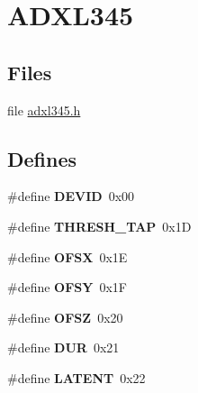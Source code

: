 \hypertarget{group___a_d_x_l345}{
\section{ADXL345}
\label{group___a_d_x_l345}
}
\subsection*{Files}
\begin{DoxyCompactItemize}
\item 
file \hyperlink{adxl345_8h}{adxl345.h}
\end{DoxyCompactItemize}
\subsection*{Defines}
\begin{DoxyCompactItemize}
\item 
\hypertarget{group___a_d_x_l345_gaa58e0287a2b6f1815a98c7e5e6724e20}{
\#define {\bfseries DEVID}~0x00}
\label{group___a_d_x_l345_gaa58e0287a2b6f1815a98c7e5e6724e20}

\item 
\hypertarget{group___a_d_x_l345_gad8cef9349ca846328f439fcb51993bb5}{
\#define {\bfseries THRESH\_\-TAP}~0x1D}
\label{group___a_d_x_l345_gad8cef9349ca846328f439fcb51993bb5}

\item 
\hypertarget{group___a_d_x_l345_gaed743ef8e7fd8d1bc4f3a456e730c432}{
\#define {\bfseries OFSX}~0x1E}
\label{group___a_d_x_l345_gaed743ef8e7fd8d1bc4f3a456e730c432}

\item 
\hypertarget{group___a_d_x_l345_ga8033e657e74ff6ca78685f261033a8c5}{
\#define {\bfseries OFSY}~0x1F}
\label{group___a_d_x_l345_ga8033e657e74ff6ca78685f261033a8c5}

\item 
\hypertarget{group___a_d_x_l345_ga0edf225116b246ec3316391691a2a634}{
\#define {\bfseries OFSZ}~0x20}
\label{group___a_d_x_l345_ga0edf225116b246ec3316391691a2a634}

\item 
\hypertarget{group___a_d_x_l345_gaf8ac375e38f541d5731744e12fec07ca}{
\#define {\bfseries DUR}~0x21}
\label{group___a_d_x_l345_gaf8ac375e38f541d5731744e12fec07ca}

\item 
\hypertarget{group___a_d_x_l345_gacad26272f1e050d1b2b2a41b84a471a2}{
\#define {\bfseries LATENT}~0x22}
\label{group___a_d_x_l345_gacad26272f1e050d1b2b2a41b84a471a2}


\end{DoxyCompactItemize}
